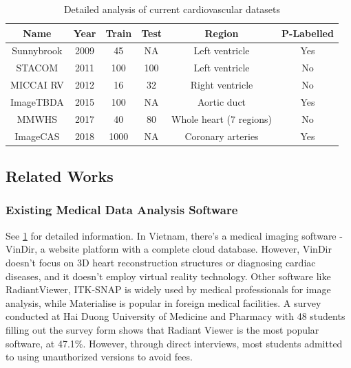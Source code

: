\documentclass{article}
\begin{document}
\begin{multicols}{2}
\begin{table}[]
    \centering
    \begin{tabular}{c|c|c|c|c|c}
         \textbf{Name} & \textbf{Year} & \textbf{Train} & \textbf{Test} & \textbf{Region} & \textbf{P-Labelled} \\
         \midrule
         Sunnybrook & 2009 & 45 & NA & Left ventricle & Yes \\ 
         STACOM &  2011 & 100 & 100 & Left ventricle & No \\ 
         MICCAI RV & 2012 & 16 & 32 & Right ventricle & No \\ 
         ImageTBDA & 2015 & 100 & NA & Aortic duct & Yes \\ 
         MMWHS &  2017 & 40 & 80 & Whole heart (7 regions) & No \\ 
         ImageCAS & 2018 & 1000 & NA & Coronary arteries & Yes \\ 
    \end{tabular}
    \caption{Detailed analysis of current cardiovascular datasets}
    \label{tab:1}
\end{table}

\subsection{Related Works}
\subsubsection{Existing Medical Data Analysis Software}
See \ref{tab:1} for detailed information. In Vietnam, there's a medical imaging software - VinDir, a website platform with a complete cloud database. However, VinDir doesn't focus on 3D heart reconstruction structures or diagnosing cardiac diseases, and it doesn't employ virtual reality technology. Other software like RadiantViewer, ITK-SNAP is widely used by medical professionals for image analysis, while Materialise is popular in foreign medical facilities. A survey conducted at Hai Duong University of Medicine and Pharmacy with 48 students filling out the survey form shows that Radiant Viewer is the most popular software, at 47.1\%. However, through direct interviews, most students admitted to using unauthorized versions to avoid fees.


\end{multicols}
\end{document}

